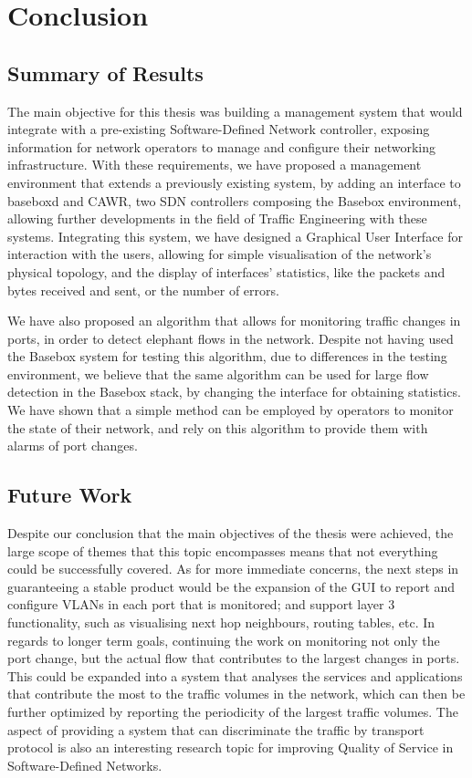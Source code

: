 \chapter{Conclusion}

\section{Summary of Results}

The main objective for this thesis was building a management system that would integrate with a pre-existing Software-Defined Network controller, exposing information
for network operators to manage and configure their networking infrastructure. With these requirements, we have proposed a management environment that extends a
previously existing system, by adding an interface to baseboxd and CAWR, two SDN controllers composing the Basebox environment, allowing further developments in the 
field of Traffic Engineering with these systems.  Integrating this system, we have designed a Graphical User Interface for interaction with the users, allowing for
simple visualisation of the network's physical topology, and the display of interfaces' statistics, like the packets and bytes received and sent, or the number of 
errors. 

\par We have also proposed an algorithm that allows for monitoring traffic changes in ports, in order to detect elephant flows in the network. Despite not having
used the Basebox system for testing this algorithm, due to differences in the testing environment, we believe that the same algorithm can be used for large flow 
detection in the Basebox stack, by changing the interface for obtaining statistics. We have shown that a simple method can be employed by operators to monitor the
state of their network, and rely on this algorithm to provide them with alarms of port changes.

\section{Future Work}

Despite our conclusion that the main objectives of the thesis were achieved, the large scope of themes that this topic encompasses means that not everything could be 
successfully covered. As for more immediate concerns, the next steps in guaranteeing a stable product would be the expansion  of the GUI to report and configure 
VLANs in each port that is monitored; and support layer 3 functionality, such as visualising next hop neighbours, routing tables, etc. In regards to longer term
goals, continuing the work on monitoring not only the port change, but the actual flow that contributes to the largest changes in ports. This could be expanded 
into a system that analyses the services and applications that contribute the most to the traffic volumes in the network, which can then be further optimized by 
reporting the periodicity of the largest traffic volumes. The aspect of providing a system that can discriminate the traffic by transport protocol is also an 
interesting research topic for improving Quality of Service in Software-Defined Networks.
